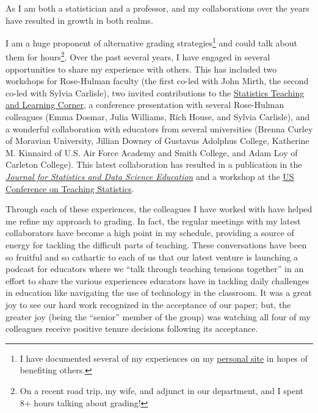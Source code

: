\documentclass[
  letterpaper,
  DIV=11,
  numbers=noendperiod]{scrreprt}
\begin{document}
\begin{tcolorbox}[enhanced jigsaw, coltitle=black, colframe=quarto-callout-note-color-frame, opacityback=0, rightrule=.15mm, bottomrule=.15mm, leftrule=.75mm, bottomtitle=1mm, colbacktitle=quarto-callout-note-color!10!white, breakable, titlerule=0mm, title=\textcolor{quarto-callout-note-color}{\faInfo}\hspace{0.5em}{Note}, left=2mm, toptitle=1mm, toprule=.15mm, colback=white, arc=.35mm, opacitybacktitle=0.6]

As I am both a statistician and a professor, and my collaborations over
the years have resulted in growth in both realms.

\end{tcolorbox}

I am a huge proponent of alternative grading strategies\footnote{I have
  documented several of my experiences on my
  \href{https://reyesem.github.io/specsgrading.html}{personal site} in
  hopes of benefiting others.} and could talk about them for
hours\footnote{On a recent road trip, my wife, and adjunct in our
  department, and I spent 8+ hours talking about grading!}. Over the
past several years, I have engaged in several opportunities to share my
experience with others. This has included two workshops for Rose-Hulman
faculty (the first co-led with John Mirth, the second co-led with Sylvia
Carlisle), two invited contributions to the
\href{https://stattlc.com/2021/02/04/specifications-grading-an-overview/}{Statistics
Teaching and Learning Corner}, a conference presentation with several
Rose-Hulman colleagues (Emma Dosmar, Julia Williams, Rich House, and
Sylvia Carlisle), and a wonderful collaboration with educators from
several universities (Brenna Curley of Moravian University, Jillian
Downey of Gustavus Adolphus College, Katherine M. Kinnaird of U.S. Air
Force Academy and Smith College, and Adam Loy of Carleton College). This
latest collaboration has resulted in a publication in the
\href{https://www.tandfonline.com/doi/full/10.1080/26939169.2023.2277851}{\emph{Journal
for Statistics and Data Science Education}} and a workshop at the
\href{https://www.causeweb.org/cause/uscots/uscots23/w14-communicating-progress-statistics-course-through-non-traditional-grading-room}{US
Conference on Teaching Statistics}.

Through each of these experiences, the colleagues I have worked with
have helped me refine my approach to grading. In fact, the regular
meetings with my latest collaborators have become a high point in my
schedule, providing a source of energy for tackling the difficult parts
of teaching. These conversations have been so fruitful and so cathartic
to each of us that our latest venture is launching a podcast for
educators where we ``talk through teaching tensions together'' in an
effort to share the various experiences educators have in tackling daily
challenges in education like navigating the use of technology in the
classroom. It was a great joy to see our hard work recognized in the
acceptance of our paper; but, the greater joy (being the ``senior''
member of the group) was watching all four of my colleagues receive
positive tenure decisions following its acceptance.
\end{document}
